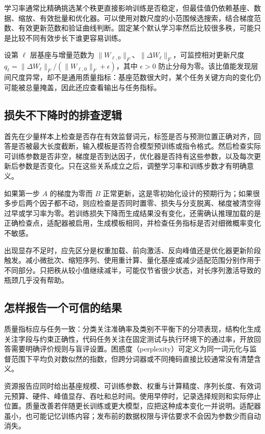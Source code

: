 \documentclass[UTF8,12pt,a4paper,fontset=fandol]{ctexart}
\begin{document}
学习率通常比精确挑选某个秩更直接影响训练是否稳定，但最佳值仍依赖基座、数据、缩放、有效批量和优化器。可以使用对数尺度的小范围候选搜索，结合梯度范数、有效更新范数和验证曲线判断。固定某个默认学习率然后比较很多秩，可能只是比较不同有效步长下谁更容易训练。

设第 $\ell$ 层基座与增量范数为
$\|W_{\ell,0}\|_F$、$\|\Delta W_\ell\|_F$，可监控相对更新尺度
$q_\ell=\|\Delta W_\ell\|_F/(\|W_{\ell,0}\|_F+\epsilon)$，其中 $\epsilon>0$ 防止分母为零。该比值能发现层间尺度异常，却不是通用质量指标：基座范数很大时，某个任务关键方向的变化仍可能被总量掩盖，因此还应查看输出与任务指标。

\subsection{损失不下降时的排查逻辑}

首先在少量样本上检查是否存在有效监督词元，标签是否与预测位置正确对齐，回答是否被最大长度截断，输入模板是否符合模型预训练或指令格式。然后检查实际可训练参数是否非空，梯度是否到达因子，优化器是否持有这些参数，以及每次更新后参数是否变化。只在这些关系成立之后，调整学习率和训练步数才有明确意义。

如果第一步 $A$ 的梯度为零而 $B$ 正常更新，这是零初始化设计的预期行为；如果很多步后两个因子都不动，则应检查是否同时置零、损失与分支脱离、梯度被清空得过早或学习率为零。若训练损失下降而生成结果没有变化，还需确认推理加载的是正确检查点，适配器被启用，生成模板相同，并检查任务指标是否对细微概率变化不敏感。

出现显存不足时，应先区分是权重加载、前向激活、反向峰值还是优化器更新阶段触发。减小微批次、缩短序列、使用重计算、量化基座或减少适配范围分别作用于不同部分。只把秩从较小值继续减半，可能仅节省很少状态，对长序列激活导致的瓶颈几乎没有帮助。

\subsection{怎样报告一个可信的结果}

质量指标应与任务一致：分类关注准确率及类别不平衡下的分项表现，结构化生成关注字段与约束正确性，代码任务关注在固定测试与执行环境下的通过率，开放回答需要明确评价规则与盲评设置。困惑度（perplexity）可定义为同一词元化与监督范围下平均负对数似然的指数，但跨分词器或不同掩码直接比较通常没有清楚含义。

资源报告应同时给出基座规模、可训练参数、权重与计算精度、序列长度、有效词元预算、硬件、峰值显存、吞吐和总时间。使用早停时，记录选择规则和实际停止位置。质量改善若伴随更长训练或更大模型，应把这种成本变化一并说明。适配器虽小，也可能记忆训练内容；发布前的数据权限与评估要求不会因为参数少而自动消失。
\end{document}
